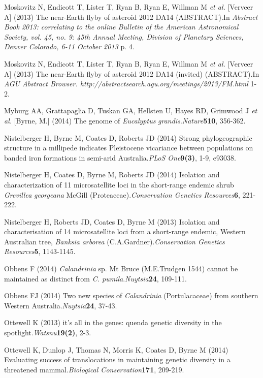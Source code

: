 \documentclass[version=last, paper=a4, DIV=18, usenames, dvipsnames]{scrartcl}
\begin{document}
Moskovitz N, Endicott T, Lister T, Ryan B, Ryan E, Willman M \emph{et al.} [Verveer A] (2013) The near-Earth flyby of asteroid 2012 DA14 (ABSTRACT).In \emph{Abstract Book 2013: correlating to the online Bulletin of the American Astronomical Society, vol. 45, no. 9: 45th Annual Meeting, Division of Planetary Sciences, Denver Colorado, 6-11 October 2013} p. 4.


Moskovitz N, Endicott T, Lister T, Ryan B, Ryan E, Willman M \emph{et al.} [Verveer A] (2013) The near-Earth flyby of asteroid 2012 DA14 (invited) (ABSTRACT).In \emph{AGU Abstract Browser. http://abstractsearch.agu.org/meetings/2013/FM.html} 1-2.


Myburg AA, Grattapaglia D, Tuskan GA, Hellsten U, Hayes RD, Grimwood J \emph{et al.} [Byrne, M.] (2014) The genome of \emph{Eucalyptus} \emph{grandis}.\emph{Nature}\textbf{510}, 356-362.


Nistelberger H, Byrne M, Coates D, Roberts JD (2014) Strong phylogeographic structure in a millipede indicates Pleistocene vicariance between populations on banded iron formations in semi-arid Australia.\emph{PLoS One}\textbf{9(3)}, 1-9, e93038.


Nistelberger H, Coates D, Byrne M, Roberts JD (2014) Isolation and characterization of 11 microsatellite loci in the short-range endemic shrub \emph{Grevillea} \emph{georgeana} McGill (Proteaceae).\emph{Conservation Genetics Resources}\textbf{6}, 221-222.


Nistelberger H, Roberts JD, Coates D, Byrne M (2013) Isolation and characterisation of 14 microsatellite loci from a short-range endemic, Western Australian tree, \emph{Banksia} \emph{arborea} (C.A.Gardner).\emph{Conservation Genetics Resources}\textbf{5}, 1143-1145.


Obbens F (2014) \emph{Calandrinia} sp. Mt Bruce (M.E.Trudgen 1544) cannot be maintained as distinct from \emph{C. pumila}.\emph{Nuytsia}\textbf{24}, 109-111.


Obbens FJ (2014) Two new species of \emph{Calandrinia} (Portulacaceae) from southern Western Australia.\emph{Nuytsia}\textbf{24}, 37-43.


Ottewell K (2013) it's all in the genes: quenda genetic diversity in the spotlight.\emph{Watsnu}\textbf{19(2)}, 2-3.


Ottewell K, Dunlop J, Thomas N, Morris K, Coates D, Byrne M (2014) Evaluating success of translocations in maintaining genetic diversity in a threatened mammal.\emph{Biological Conservation}\textbf{171}, 209-219.
\end{document}
